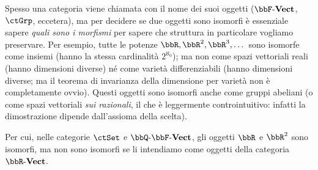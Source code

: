 \begin{warning}
	Spesso una categoria viene chiamata con il nome dei suoi oggetti (\(\ctVect\), \(\ctGrp\), eccetera), ma per decidere se due oggetti sono isomorfi è essenziale sapere \emph{quali sono i morfismi} per sapere che struttura in particolare vogliamo preservare. Per esempio, tutte le potenze \(\bbR,\bbR^2,\bbR^3,\dots\) sono isomorfe come insiemi (hanno la stessa cardinalità \(2^{\aleph_0}\)); ma non come spazi vettoriali reali (hanno dimensioni diverse) né come varietà differenziabili (hanno dimensioni diverse; ma il teorema di invarianza della dimensione per varietà non è completamente ovvio). Questi oggetti sono isomorfi anche come gruppi abeliani (o come spazi vettoriali \emph{sui razionali}, il che è leggermente controintuitivo: infatti la dimostrazione dipende dall'assioma della scelta).

	Per cui, nelle categorie \(\ctSet\) e \(\bbQ\emdash\ctVect\), gli oggetti \(\bbR\) e \(\bbR^2\) sono isomorfi, ma non sono isomorfi se li intendiamo come oggetti della categoria \(\ctVect[\bbR]\).
\end{warning}

